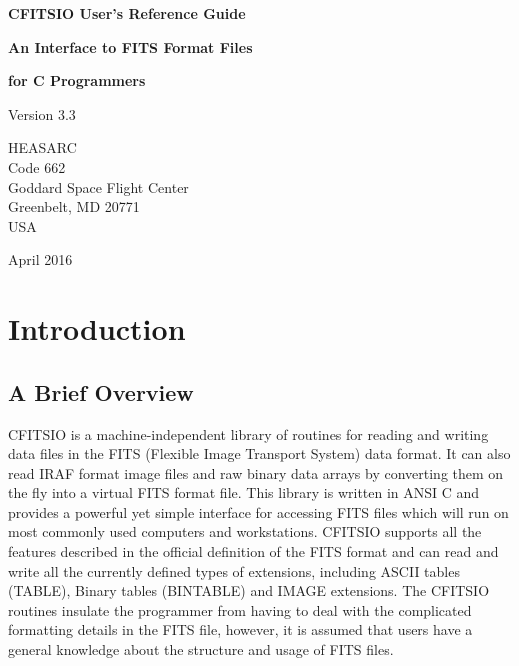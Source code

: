 \documentclass[11pt]{book}
\begin{document}

\begin{titlepage}
\normalsize
\vspace*{4.0cm}
\begin{center}
{\Huge \bf CFITSIO User's Reference Guide}\\
\end{center}
\medskip 
\medskip 
\begin{center}
{\LARGE \bf An Interface to FITS Format Files}\\
\end{center}
\begin{center}
{\LARGE \bf for C Programmers}\\
\end{center}
\medskip
\medskip
\begin{center}
{\Large Version 3.3 \\}
\end{center}
\bigskip
\vskip 2.5cm
\begin{center}
{HEASARC\\
Code 662\\
Goddard Space Flight Center\\
Greenbelt, MD 20771\\
USA}
\end{center}

\vfill
\bigskip
\begin{center}
{\Large April 2016\\}
\end{center}
\vfill
\end{titlepage}

\clearpage

\tableofcontents
\chapter{Introduction }


\section{ A Brief Overview}

CFITSIO is a machine-independent library of routines for reading and
writing data files in the FITS (Flexible Image Transport System) data
format.  It can also read IRAF format image files and raw binary data
arrays by converting them on the fly into a virtual FITS format file.
This library is written in ANSI C and provides a powerful yet simple
interface for accessing FITS files which will run on most commonly used
computers and workstations.  CFITSIO supports all the features
described in the official definition of the FITS format and can
read and write all the currently defined types of extensions, including
ASCII tables (TABLE), Binary tables (BINTABLE) and IMAGE extensions.
The CFITSIO routines insulate the programmer from having to deal with
the complicated formatting details in the FITS file, however, it is
assumed that users have a general knowledge about the structure and
usage of FITS files.
\end{document}

